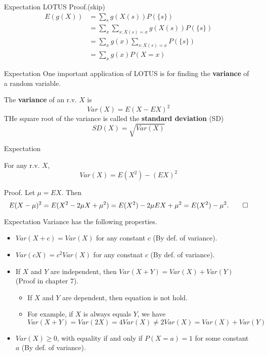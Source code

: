 \documentclass{beamer}
\newcommand{\tb}[1]{\textbf{#1}}
\begin{document}
\begin{frame}{Expectation}
    LOTUS Proof.(skip)
    \[
    \begin{aligned}
        E(g(X)) &= \sum_s g(X(s))P(\{s\}) \\
        &= \sum_x \sum_{s:X(s)=x} g(X(s)) P(\{s\})\\
        &= \sum_x g(x) \sum_{s:X(s)=x} P(\{s\}) \\
        &= \sum_x g(x) P(X=x)
    \end{aligned}
    \]
\end{frame}

\begin{frame}{Expectation}
    One important application of LOTUS is for finding the \tb{variance} of a random variable.
    \begin{definition}
        The \tb{variance} of an r.v. $X$ is
        \[ Var(X) = E(X-EX)^2\]
        THe square root of the variance is called the \tb{standard deviation} (SD)
        \[SD(X) = \sqrt{Var(X)}\]
    \end{definition}
\end{frame}

\begin{frame}{Expectation}
    \begin{theorem}
        For any r.v. $X$,
        \[
            Var(X) = E(X^2) - (EX)^2
        \]
    \end{theorem}
    Proof. Let $\mu = EX$. Then
    \[
        E(X-\mu)^2 = E(X^2 - 2\mu X + \mu^2) = E(X^2) - 2\mu EX +\mu^2 = E(X^2) - \mu^2. \qed
    \]
\end{frame}

\begin{frame}{Expectation}
    Variance has the following properties.
    \begin{itemize}
        \item $Var(X+c) = Var(X)$ for any constant $c$ (By def. of variance).
        \item $Var(cX) = c^2 Var(X)$ for any constnat $c$ (By def. of variance).
        \item If $X$ and $Y$ are independent, then $Var(X+Y) = Var(X) + Var(Y)$ (Proof in chapter 7).
        \begin{itemize}
            \item If $X$ and $Y$ are dependent, then equation is not hold.
            \item For example, if $X$ is always equals $Y$, we have \[
                Var(X+Y) = Var(2X) = 4Var(X) \neq 2Var(X) = Var(X) + Var(Y)
            \]
        \end{itemize}
        \item $Var(X) \geq 0$, with equality if and only if $P(X=a)=1$ for some constant $a$ (By def. of variance).
    \end{itemize}
\end{frame}
\end{document}
